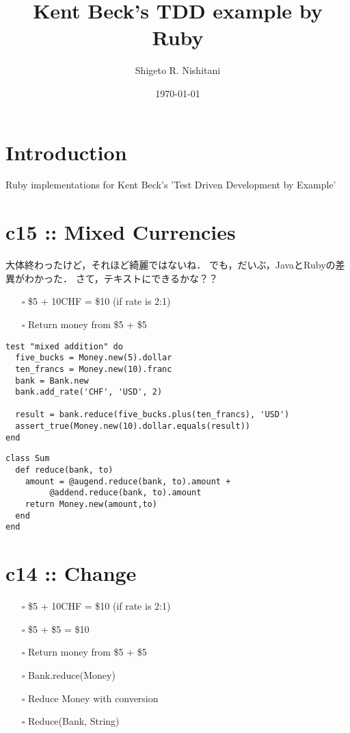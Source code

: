 \documentclass[11pt]{article}
\author{Shigeto R. Nishitani}
\date{\today}
\title{Kent Beck's TDD example by Ruby}
\begin{document}
\maketitle
\tableofcontents


\section{Introduction}
\label{sec:orgcb5f71e}
Ruby implementations for Kent Beck's 'Test Driven Development by Example'

\section{c15 :: Mixed Currencies}
\label{sec:org9f4cd32}
大体終わったけど，それほど綺麗ではないね．
でも，だいぶ，JavaとRubyの差異がわかった．
さて，テキストにできるかな？？

\begin{itemize}
\item[{$\square$}] \$5 + 10CHF = \$10 (if rate is 2:1)
\item[{$\square$}] Return money from \$5 + \$5
\end{itemize}
\begin{verbatim}
test "mixed addition" do
  five_bucks = Money.new(5).dollar
  ten_francs = Money.new(10).franc
  bank = Bank.new
  bank.add_rate('CHF', 'USD', 2)

  result = bank.reduce(five_bucks.plus(ten_francs), 'USD')
  assert_true(Money.new(10).dollar.equals(result))
end
\end{verbatim}

\begin{verbatim}
class Sum
  def reduce(bank, to)
    amount = @augend.reduce(bank, to).amount +
	     @addend.reduce(bank, to).amount
    return Money.new(amount,to)
  end
end
\end{verbatim}

\section{c14 :: Change}
\label{sec:org37746b1}
\begin{itemize}
\item[{$\square$}] \$5 + 10CHF = \$10 (if rate is 2:1)
\item[{$\square$}] \$5 + \$5 = \$10
\item[{$\square$}] Return money from \$5 + \$5
\item[{$\square$}] Bank.reduce(Money)
\item[{$\square$}] Reduce Money with conversion
\item[{$\square$}] Reduce(Bank, String)
\end{itemize}
\end{document}
